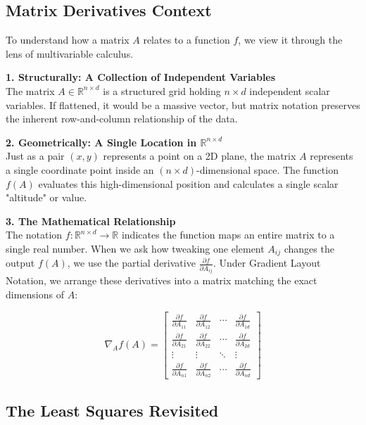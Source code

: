 \documentclass[12pt, a4paper]{report}
\begin{document}
\subsection{Matrix Derivatives Context}

To understand how a matrix $A$ relates to a function $f$, we view it through the lens of multivariable calculus. 

\textbf{1. Structurally: A Collection of Independent Variables} \\
The matrix $A \in \mathbb{R}^{n \times d}$ is a structured grid holding $n \times d$ independent scalar variables. If flattened, it would be a massive vector, but matrix notation preserves the inherent row-and-column relationship of the data.

\textbf{2. Geometrically: A Single Location in $\mathbb{R}^{n \times d}$} \\
Just as a pair $(x, y)$ represents a point on a 2D plane, the matrix $A$ represents a single coordinate point inside an $(n \times d)$-dimensional space. The function $f(A)$ evaluates this high-dimensional position and calculates a single scalar "altitude" or value.

\textbf{3. The Mathematical Relationship} \\
The notation $f : \mathbb{R}^{n \times d} \to \mathbb{R}$ indicates the function maps an entire matrix to a single real number. When we ask how tweaking one element $A_{ij}$ changes the output $f(A)$, we use the partial derivative $\frac{\partial f}{\partial A_{ij}}$. Under Gradient Layout Notation, we arrange these derivatives into a matrix matching the exact dimensions of $A$:

\[
\nabla_A f(A) = \begin{bmatrix}  \frac{\partial f}{\partial A_{11}} & \frac{\partial f}{\partial A_{12}} & \cdots & \frac{\partial f}{\partial A_{1d}} \\  \frac{\partial f}{\partial A_{21}} & \frac{\partial f}{\partial A_{22}} & \cdots & \frac{\partial f}{\partial A_{2d}} \\  \vdots & \vdots & \ddots & \vdots \\  \frac{\partial f}{\partial A_{n1}} & \frac{\partial f}{\partial A_{n2}} & \cdots & \frac{\partial f}{\partial A_{nd}}  \end{bmatrix}
\]

\subsection{The Least Squares Revisited}
\end{document}
